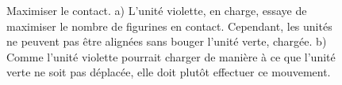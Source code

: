 \newcommand{\chargealignmentA}{a)}
\newcommand{\chargealignmentB}{b)}
\newcommand{\chargealignmentOne}{1}
\newcommand{\chargealignmentTwo}{2}
\newcommand{\chargealignmentCharge}{\normalfontsize{\flufffont{Charge !}}}

\begin{figure}[!htbp]
\centering
\hypertarget{chargealignmentfigure}{
\def\svgwidth{0.7\textwidth}
}
\caption{Maximiser le contact.\vspace*{10pt}\newline
a) L'unité violette, en charge, essaye de maximiser le nombre de figurines en contact. Cependant, les unités ne peuvent pas être alignées sans bouger l'unité verte, chargée.\vspace*{10pt}\newline
b) Comme l'unité violette pourrait charger de manière à ce que l'unité verte ne soit pas déplacée, elle doit plutôt effectuer ce mouvement.}
\label{figure/chargealignment}
\end{figure}

\newcommand{\multiplechargesCharge}{\flufffont{Charge !}}
\newcommand{\multiplechargesOne}{1)}
\newcommand{\multiplechargesTwoA}{2.a)}
\newcommand{\multiplechargesTwoB}{2.b)}
\newcommand{\multiplechargesTwoC}{2.c)}
\newcommand{\multiplechargesTwoD}{2.d)}

